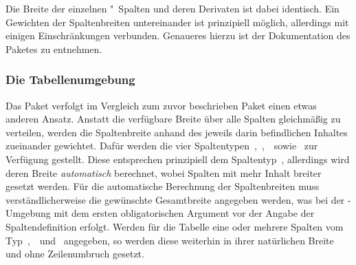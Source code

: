 \documentclass[%
  english,ngerman,%
  cdgeometry=no,DIV=12,automark,%
]{tudscrartcl}
\begin{document}
\InputCode\noindent
%
Die Breite der einzelnen "~Spalten und deren Derivaten ist dabei 
identisch. Ein Gewichten der Spaltenbreiten untereinander ist prinzipiell 
möglich, allerdings mit einigen Einschränkungen verbunden. Genaueres hierzu ist 
der Dokumentation des Paketes  zu entnehmen.

\subsubsection{Die Tabellenumgebung }
\label{sec:tabulary}
Das Paket  verfolgt im Vergleich zum zuvor beschrieben Paket 
 einen etwas anderen Ansatz. Anstatt die verfügbare Breite 
über alle Spalten gleichmäßig zu verteilen, werden die Spaltenbreite anhand des 
jeweils darin befindlichen Inhaltes zueinander gewichtet. Dafür werden die vier 
Spaltentypen~,~,~~sowie~ zur Verfügung 
gestellt. Diese entsprechen prinzipiell dem Spaltentyp~, allerdings 
wird deren Breite \emph{automatisch} berechnet, wobei Spalten mit mehr Inhalt 
breiter gesetzt werden. Für die automatische Berechnung der Spaltenbreiten muss 
verständlicherweise die gewünschte Gesamtbreite angegeben werden, was bei der 
-Umgebung mit dem ersten obligatorischen Argument vor der 
Angabe der Spaltendefinition erfolgt. Werden für die Tabelle eine oder mehrere 
Spalten vom Typ~,~~und~ angegeben, so werden 
diese weiterhin in ihrer natürlichen Breite und ohne Zeilenumbruch gesetzt. 
\end{document}
